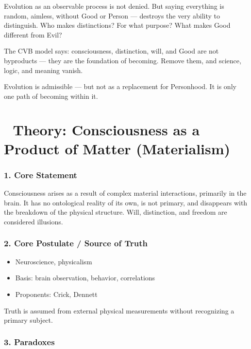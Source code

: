 \documentclass[12pt]{article}
\begin{document}
Evolution as an observable process is not denied. But saying everything is random, aimless, without Good or Person — destroys the very ability to distinguish. Who makes distinctions? For what purpose? What makes Good different from Evil?

The CVB model says: consciousness, distinction, will, and Good are not byproducts — they are the foundation of becoming. Remove them, and science, logic, and meaning vanish.

Evolution is admissible — but not as a replacement for Personhood. It is only one path of becoming within it.

\section*{🔷 Theory: Consciousness as a Product of Matter (Materialism)}

\subsubsection*{1. Core Statement}

Consciousness arises as a result of complex material interactions, primarily in the brain. It has no ontological reality of its own, is not primary, and disappears with the breakdown of the physical structure. Will, distinction, and freedom are considered illusions.

\subsubsection*{2. Core Postulate / Source of Truth}

\begin{itemize}
\item Neuroscience, physicalism
\item Basis: brain observation, behavior, correlations
\item Proponents: Crick, Dennett
\end{itemize}

Truth is assumed from external physical measurements without recognizing a primary subject.

\subsubsection*{3. Paradoxes}
\end{document}
